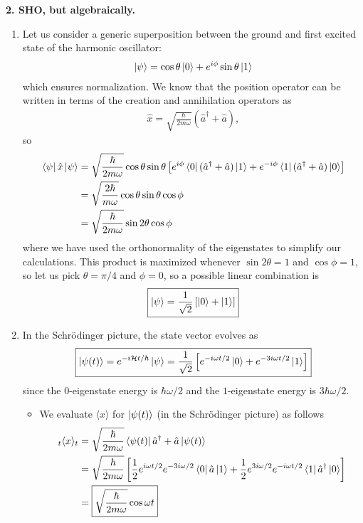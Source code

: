 \documentclass{article}
\theoremstyle{definition}
\newcommand{\ham}{\mathcal{H}}
\newcommand{\f}[2]{\frac{#1}{#2}}
\newcommand{\lb}{\left[}
\newcommand{\rb}{\right]}
\begin{document}
\noindent \textbf{2. SHO, but algebraically.}

\begin{enumerate}[label=(\alph*)]
	\item Let us consider a generic superposition between the ground and first excited state of the harmonic oscillator:
	\begin{align*}
	\ket{\psi} = \cos\theta \ket{0} + e^{i\phi}\sin\theta \ket{1}
	\end{align*}
	which ensures normalization. We know that the position operator can be written in terms of the creation and annihilation operators as 
	\begin{align*}
	\hat{x} = \sqrt{\f{\hbar}{2m\omega}}(\hat{a}^\dagger + \hat{a}),
	\end{align*}
	so 
	\begin{align*}
	\bra{\psi} \hat{x} \ket{\psi} &= \sqrt{\f{\hbar}{2m\omega}} \cos\theta \sin\theta  \lb  e^{i\phi} \bra{0} (\hat a^\dagger + \hat a) \ket{1} +  e^{-i\phi}\bra{1} (\hat a^\dagger + \hat a) \ket{0} \rb\\
	&= 	\sqrt{\f{2\hbar}{m\omega}} \cos\theta \sin\theta  \cos \phi\\
	&= 	\sqrt{\f{\hbar}{2m\omega}} \sin 2\theta  \cos \phi
	\end{align*}
	where we have used the orthonormality of the eigenstates to simplify our calculations. This product is maximized whenever $\sin 2\theta = 1$ and $\cos\phi = 1$, so let us pick $\theta = \pi/4$ and $\phi = 0$, so a possible linear combination is 
	\begin{align*}
	\boxed{\ket{\psi} = \f{1}{\sqrt{2}}\lb \ket{0} + \ket{1}\rb} 
	\end{align*}
	
	\item In the Schr\"{o}dinger picture, the state vector evolves as
	\begin{align*}
	\boxed{\ket{\psi(t)} = e^{-i\ham t /\hbar} \ket{\psi} = \f{1}{\sqrt{2}}\lb e^{-i \omega t/2 } \ket{0} + e^{-3i\omega t/2}\ket{1}\rb}
	\end{align*}
	since the $0$-eigenstate energy is $\hbar \omega /2$ and the $1$-eigenstate energy is $3\hbar \omega/2$.
	
	\begin{itemize}
		\item We evaluate $\langle x \rangle$ for $\ket{\psi(t)}$ (in the Schr\"{o}dinger picture) as follows
		\begin{align*}
		_t\langle x \rangle_t &= \sqrt{\f{\hbar}{2m\omega}}\bra{\psi(t)}  \hat a^\dagger + \hat a \ket{\psi(t)} \\
		&= \sqrt{\f{\hbar}{2m\omega}} \lb \f{1}{2}  e^{i\omega t/2} e^{-3i\omega/2}  \bra{0} \hat a \ket{1} + \f{1}{2} e^{3i\omega/2} e^{-i\omega t/2}  \bra{1} \hat a^\dagger \ket{0} \rb\\
		&= \boxed{\sqrt{\f{\hbar}{2m\omega}}\cos\omega t}
		\end{align*}
		

\end{itemize}
\end{enumerate}
\end{document}
